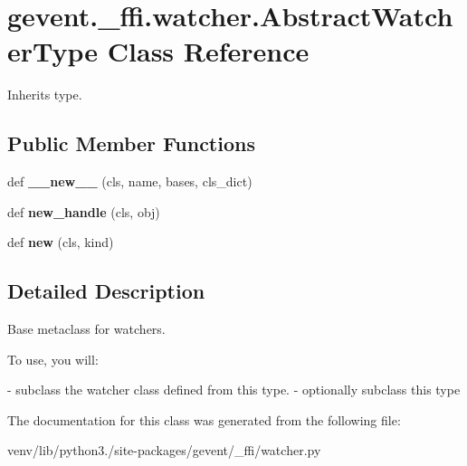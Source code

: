 \hypertarget{classgevent_1_1__ffi_1_1watcher_1_1_abstract_watcher_type}{}\section{gevent.\+\_\+ffi.\+watcher.\+Abstract\+Watcher\+Type Class Reference}
\label{classgevent_1_1__ffi_1_1watcher_1_1_abstract_watcher_type}


Inherits type.

\subsection*{Public Member Functions}
\begin{DoxyCompactItemize}
\item 
\mbox{\label{classgevent_1_1__ffi_1_1watcher_1_1_abstract_watcher_type_a4ef365feece18f665d01e5262476c02f}} 
def {\bfseries \+\_\+\+\_\+new\+\_\+\+\_\+} (cls, name, bases, cls\+\_\+dict)
\item 
\mbox{\label{classgevent_1_1__ffi_1_1watcher_1_1_abstract_watcher_type_a3cfc5652a70e827e54cead92d93e6093}} 
def {\bfseries new\+\_\+handle} (cls, obj)
\item 
\mbox{\label{classgevent_1_1__ffi_1_1watcher_1_1_abstract_watcher_type_aeb21bca4fcb5f75ececf5d77ab5e1a4b}} 
def {\bfseries new} (cls, kind)
\end{DoxyCompactItemize}


\subsection{Detailed Description}
\begin{DoxyVerb}Base metaclass for watchers.

To use, you will:

- subclass the watcher class defined from this type.
- optionally subclass this type
\end{DoxyVerb}
 

The documentation for this class was generated from the following file\+:\begin{DoxyCompactItemize}
\item 
venv/lib/python3./site-\/packages/gevent/\+\_\+ffi/watcher.\+py\end{DoxyCompactItemize}

